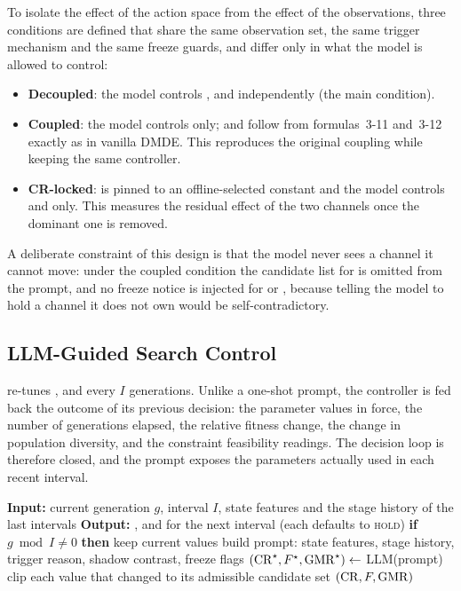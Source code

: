 To isolate the effect of the action space from the effect of the observations,
three conditions are defined that share the same observation set, the same
trigger mechanism and the same freeze guards, and differ only in what the model
is allowed to control:

\begin{itemize}
  \item \textbf{Decoupled}: the model controls \CR{}, \Ffactor{} and \GMR{}
        independently (the main condition).
  \item \textbf{Coupled}: the model controls \CR{} only; \Ffactor{} and
        \GMR{} follow from formulas~3-11 and~3-12 exactly as in vanilla DMDE.
        This reproduces the original coupling while keeping the same controller.
  \item \textbf{CR-locked}: \CR{} is pinned to an offline-selected constant
        and the model controls \Ffactor{} and \GMR{} only. This measures the
        residual effect of the two channels once the dominant one is removed.
\end{itemize}

A deliberate constraint of this design is that the model never sees a channel it
cannot move: under the coupled condition the candidate list for \Ffactor{} is
omitted from the prompt, and no freeze notice is injected for \GMR{} or
\Ffactor{}, because telling the model to hold a channel it does not own would
be self-contradictory.

\subsection{LLM-Guided Search Control}
\label{subsec:searchctrl}

\searchctrl{} re-tunes \CR{}, \Ffactor{} and \GMR{} every $I$ generations.
Unlike a one-shot prompt, the controller is fed back the outcome of its previous
decision: the parameter values in force, the number of generations elapsed, the
relative fitness change, the change in population diversity, and the constraint
feasibility readings. The decision loop is therefore closed, and the prompt
exposes the parameters actually used in each recent interval.

\begin{algorithm}[htbp]
  \caption{\searchctrl{}}
  \label{alg:searchctrl}
  \begin{algorithmic}[1]
    \State \textbf{Input:} current generation $g$, interval $I$, state
           features and the stage history of the last intervals
    \State \textbf{Output:} \CR{}, \Ffactor{} and \GMR{} for the next
           interval (each defaults to \textsc{hold})
    \State \textbf{if} $g \bmod I \neq 0$ \textbf{then} keep current values
    \State build prompt: state features, stage history, trigger reason,
           shadow contrast, freeze flags
    \State $(\mathrm{CR}^{\star}, F^{\star}, \mathrm{GMR}^{\star}) \gets$ LLM(prompt)
    \State clip each value that changed to its admissible candidate set
    \State \Return $(\mathrm{CR}, F, \mathrm{GMR})$
  \end{algorithmic}
\end{algorithm}

